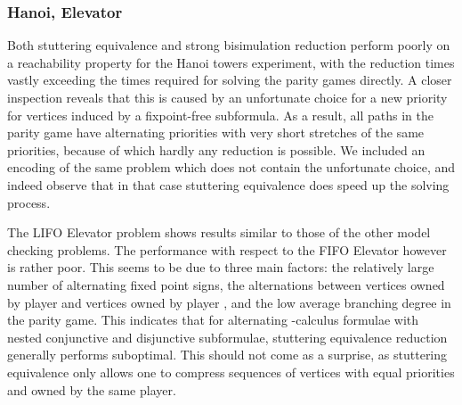 \documentclass[a4paper]{llncs}
\begin{document}
\subsubsection{Hanoi, Elevator}

Both stuttering equivalence and strong bisimulation reduction perform
poorly on a reachability property for the Hanoi towers experiment, with
the reduction times vastly exceeding the times required for solving the
parity games directly.  A closer inspection reveals that this is caused
by an unfortunate choice for a new priority for vertices induced by a
fixpoint-free subformula.  As a result, all paths in the parity game
have alternating priorities with very short stretches of the same priorities, 
because of which hardly any reduction is possible. We included an encoding of
the same problem which does not contain the unfortunate choice, and indeed
observe that in that case stuttering equivalence does speed up the solving
process.

The LIFO Elevator problem shows results similar to those of the other model 
checking problems. The performance with respect to the FIFO Elevator however is
rather poor. This seems to be due to three main factors: the relatively large 
number of alternating fixed point signs, the alternations between vertices owned
by player  and vertices owned by player , and the low average 
branching degree in the parity game. This indicates that for alternating 
-calculus formulae with nested conjunctive and disjunctive subformulae, 
stuttering equivalence reduction generally performs suboptimal. This should not 
come as a surprise, as stuttering equivalence only allows one to compress
sequences of vertices with equal priorities and owned by the same player.
\end{document}

